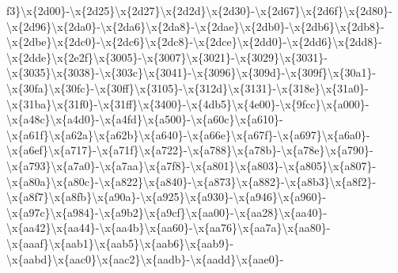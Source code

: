 \begin{DoxyCompactItemize}
f3\}\textbackslash{}x\{2d00\}-\/\textbackslash{}x\{2d25\}\textbackslash{}x\{2d27\}\textbackslash{}x\{2d2d\}\textbackslash{}x\{2d30\}-\/\textbackslash{}x\{2d67\}\textbackslash{}x\{2d6f\}\textbackslash{}x\{2d80\}-\/\textbackslash{}x\{2d96\}\textbackslash{}x\{2da0\}-\/\textbackslash{}x\{2da6\}\textbackslash{}x\{2da8\}-\/\textbackslash{}x\{2dae\}\textbackslash{}x\{2db0\}-\/\textbackslash{}x\{2db6\}\textbackslash{}x\{2db8\}-\/\textbackslash{}x\{2dbe\}\textbackslash{}x\{2dc0\}-\/\textbackslash{}x\{2dc6\}\textbackslash{}x\{2dc8\}-\/\textbackslash{}x\{2dce\}\textbackslash{}x\{2dd0\}-\/\textbackslash{}x\{2dd6\}\textbackslash{}x\{2dd8\}-\/\textbackslash{}x\{2dde\}\textbackslash{}x\{2e2f\}\textbackslash{}x\{3005\}-\/\textbackslash{}x\{3007\}\textbackslash{}x\{3021\}-\/\textbackslash{}x\{3029\}\textbackslash{}x\{3031\}-\/\textbackslash{}x\{3035\}\textbackslash{}x\{3038\}-\/\textbackslash{}x\{303c\}\textbackslash{}x\{3041\}-\/\textbackslash{}x\{3096\}\textbackslash{}x\{309d\}-\/\textbackslash{}x\{309f\}\textbackslash{}x\{30a1\}-\/\textbackslash{}x\{30fa\}\textbackslash{}x\{30fc\}-\/\textbackslash{}x\{30ff\}\textbackslash{}x\{3105\}-\/\textbackslash{}x\{312d\}\textbackslash{}x\{3131\}-\/\textbackslash{}x\{318e\}\textbackslash{}x\{31a0\}-\/\textbackslash{}x\{31ba\}\textbackslash{}x\{31f0\}-\/\textbackslash{}x\{31ff\}\textbackslash{}x\{3400\}-\/\textbackslash{}x\{4db5\}\textbackslash{}x\{4e00\}-\/\textbackslash{}x\{9fcc\}\textbackslash{}x\{a000\}-\/\textbackslash{}x\{a48c\}\textbackslash{}x\{a4d0\}-\/\textbackslash{}x\{a4fd\}\textbackslash{}x\{a500\}-\/\textbackslash{}x\{a60c\}\textbackslash{}x\{a610\}-\/\textbackslash{}x\{a61f\}\textbackslash{}x\{a62a\}\textbackslash{}x\{a62b\}\textbackslash{}x\{a640\}-\/\textbackslash{}x\{a66e\}\textbackslash{}x\{a67f\}-\/\textbackslash{}x\{a697\}\textbackslash{}x\{a6a0\}-\/\textbackslash{}x\{a6ef\}\textbackslash{}x\{a717\}-\/\textbackslash{}x\{a71f\}\textbackslash{}x\{a722\}-\/\textbackslash{}x\{a788\}\textbackslash{}x\{a78b\}-\/\textbackslash{}x\{a78e\}\textbackslash{}x\{a790\}-\/\textbackslash{}x\{a793\}\textbackslash{}x\{a7a0\}-\/\textbackslash{}x\{a7aa\}\textbackslash{}x\{a7f8\}-\/\textbackslash{}x\{a801\}\textbackslash{}x\{a803\}-\/\textbackslash{}x\{a805\}\textbackslash{}x\{a807\}-\/\textbackslash{}x\{a80a\}\textbackslash{}x\{a80c\}-\/\textbackslash{}x\{a822\}\textbackslash{}x\{a840\}-\/\textbackslash{}x\{a873\}\textbackslash{}x\{a882\}-\/\textbackslash{}x\{a8b3\}\textbackslash{}x\{a8f2\}-\/\textbackslash{}x\{a8f7\}\textbackslash{}x\{a8fb\}\textbackslash{}x\{a90a\}-\/\textbackslash{}x\{a925\}\textbackslash{}x\{a930\}-\/\textbackslash{}x\{a946\}\textbackslash{}x\{a960\}-\/\textbackslash{}x\{a97c\}\textbackslash{}x\{a984\}-\/\textbackslash{}x\{a9b2\}\textbackslash{}x\{a9cf\}\textbackslash{}x\{aa00\}-\/\textbackslash{}x\{aa28\}\textbackslash{}x\{aa40\}-\/\textbackslash{}x\{aa42\}\textbackslash{}x\{aa44\}-\/\textbackslash{}x\{aa4b\}\textbackslash{}x\{aa60\}-\/\textbackslash{}x\{aa76\}\textbackslash{}x\{aa7a\}\textbackslash{}x\{aa80\}-\/\textbackslash{}x\{aaaf\}\textbackslash{}x\{aab1\}\textbackslash{}x\{aab5\}\textbackslash{}x\{aab6\}\textbackslash{}x\{aab9\}-\/\textbackslash{}x\{aabd\}\textbackslash{}x\{aac0\}\textbackslash{}x\{aac2\}\textbackslash{}x\{aadb\}-\/\textbackslash{}x\{aadd\}\textbackslash{}x\{aae0\}-\/\textbacksla
\end{DoxyCompactItemize}

